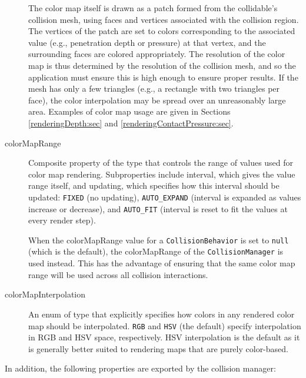 \begin{description}
The color map itself is drawn as a patch formed from the collidable's
collision mesh, using faces and vertices associated with the collision
region. The vertices of the patch are set to colors corresponding to
the associated value (e.g., penetration depth or pressure) at that
vertex, and the surrounding faces are colored appropriately.  The
resolution of the color map is thus determined by the resolution of
the collision mesh, and so the application must ensure this is high
enough to ensure proper results. If the mesh has only a few triangles
(e.g., a rectangle with two triangles per face), the color
interpolation may be spread over an unreasonably large area.  Examples
of color map usage are given in Sections \ref{renderingDepth:sec} and
\ref{renderingContactPressure:sec}.

\item[colorMapRange]\mbox{}

Composite property of the type
 that controls the range
of values used for color map rendering. Subproperties include {\sf
interval}, which gives the value range itself, and {\sf updating},
which specifies how this interval should be updated: {\tt FIXED} (no
updating), {\tt AUTO\_EXPAND} (interval is expanded as values increase
or decrease), and {\tt AUTO\_FIT} (interval is reset to fit the values
at every render step).

When the {\sf colorMapRange} value for a {\tt CollisionBehavior} is
set to {\tt null} (which is the default), the {\sf colorMapRange} of
the {\tt CollisionManager} is used instead. This has the advantage of
ensuring that the same color map range will be used across all
collision interactions.

\item[colorMapInterpolation]\mbox{}

An enum of type
 that explicitly
specifies how colors in any rendered color map should be interpolated.
{\tt RGB} and {\tt HSV} (the default) specify interpolation in RGB and
HSV space, respectively. HSV interpolation is the default as it is
generally better suited to rendering maps that are purely color-based.

\end{description}

In addition, the following properties are exported by the collision
manager:

